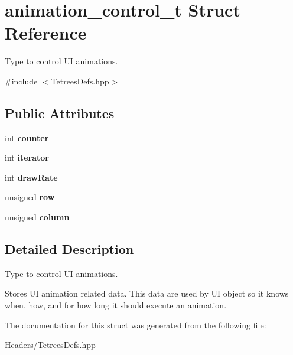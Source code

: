 \hypertarget{structanimation__control__t}{}\section{animation\+\_\+control\+\_\+t Struct Reference}
\label{structanimation__control__t}


Type to control UI animations.  




{\ttfamily \#include $<$Tetrees\+Defs.\+hpp$>$}

\subsection*{Public Attributes}
\begin{DoxyCompactItemize}
\item 
\mbox{\label{structanimation__control__t_a73ff393fa08828b3f7a20e7211cad769}} 
int {\bfseries counter}
\item 
\mbox{\label{structanimation__control__t_aef39107b1215226cb22a90eac0193b0d}} 
int {\bfseries iterator}
\item 
\mbox{\label{structanimation__control__t_a1b2d2b9a6c4a602c8f060a93b1adc072}} 
int {\bfseries draw\+Rate}
\item 
\mbox{\label{structanimation__control__t_a8ad7abe75413335a1e7984559ef2a32b}} 
unsigned {\bfseries row}
\item 
\mbox{\label{structanimation__control__t_a311b7da11edaaadae48b595082d3830f}} 
unsigned {\bfseries column}
\end{DoxyCompactItemize}


\subsection{Detailed Description}
Type to control UI animations. 

Stores UI animation related data. This data are used by UI object so it knows when, how, and for how long it should execute an animation. 

The documentation for this struct was generated from the following file\+:\begin{DoxyCompactItemize}
\item 
Headers/\hyperlink{TetreesDefs_8hpp}{Tetrees\+Defs.\+hpp}\end{DoxyCompactItemize}

